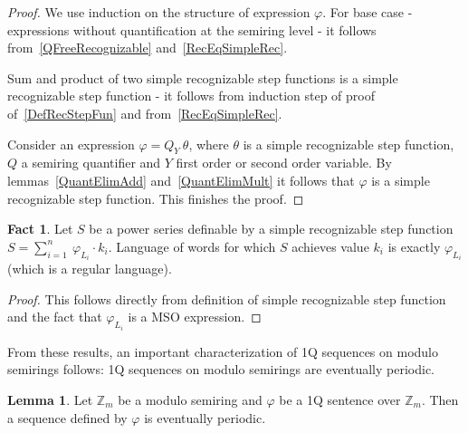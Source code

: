 \documentclass[12pt]{article}
\theoremstyle{definition}
\newtheorem{fact}{Fact}[section]
\newtheorem{lemma}[theorem]{Lemma}
\begin{document}
\begin{proof}
    We use induction on the structure of expression $\varphi$. For base case - expressions without quantification at the semiring level - it follows from~\cref{QFreeRecognizable} and~\cref{RecEqSimpleRec}. 
    
    Sum and product of two simple recognizable step functions is a simple recognizable step function - it follows from induction step of proof of~\cref{DefRecStepFun} and from~\cref{RecEqSimpleRec}.

    Consider an expression $\varphi = Q_Y \ \theta$, where $\theta$ is a simple recognizable step function, $Q$ a semiring quantifier and $Y$ first order or second order variable. By lemmas~\ref{QuantElimAdd} and~\ref{QuantElimMult} it follows that $\varphi$ is a simple recognizable step function. This finishes the proof.
\end{proof}

\begin{fact}
    \label{InvAreReg}
    Let $S$ be a power series definable by a simple recognizable step function $S = \sum_{i = 1}^{n} \ \varphi_{L_i} \cdot k_i$. Language of words for which $S$ achieves value $k_i$ is exactly $\varphi_{L_i}$ (which is a regular language).
\end{fact}

\begin{proof}
    This follows directly from definition of simple recognizable step function and the fact that $\varphi_{L_i}$ is a MSO expression.
\end{proof}

From these results, an important characterization of 1Q sequences on modulo semirings follows: 1Q sequences on modulo semirings are eventually periodic.

\begin{lemma}
    \label{OverModAreSimpleRec2}
    Let $\mathbb{Z}_m$ be a modulo semiring and $\varphi$ be a 1Q sentence over $\mathbb{Z}_m$. Then a sequence defined by $\varphi$ is eventually periodic.
\end{lemma}
\end{document}
